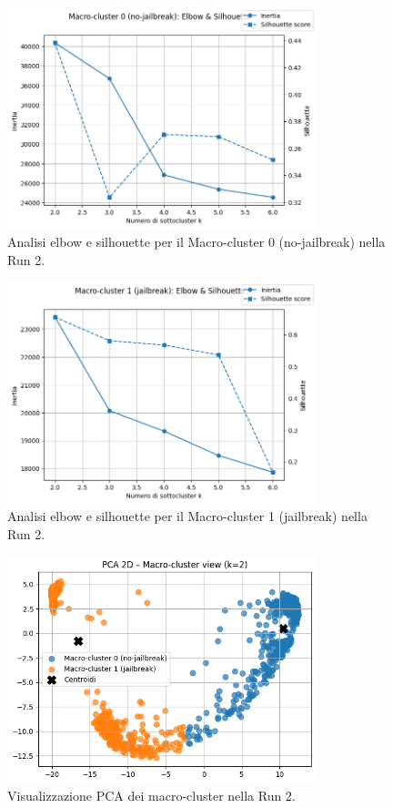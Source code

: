 \documentclass[a4paper,12pt]{article}
\begin{document}
\begin{figure}[h]
    \centering
    \includegraphics[width=0.8\textwidth]{run2-elbow0.png}
    \caption{Analisi elbow e silhouette per il Macro-cluster 0 (no-jailbreak) nella Run 2.}
    \label{fig:run2_elbow0}
\end{figure}

\begin{figure}[h]
    \centering
    \includegraphics[width=0.8\textwidth]{run2-elbow1.png}
    \caption{Analisi elbow e silhouette per il Macro-cluster 1 (jailbreak) nella Run 2.}
    \label{fig:run2_elbow1}
\end{figure}

\begin{figure}[h]
    \centering
    \includegraphics[width=0.8\textwidth]{run2-pca-tot.png}
    \caption{Visualizzazione PCA dei macro-cluster nella Run 2.}
    \label{fig:run2_pca_tot}
\end{figure}
\end{document}
